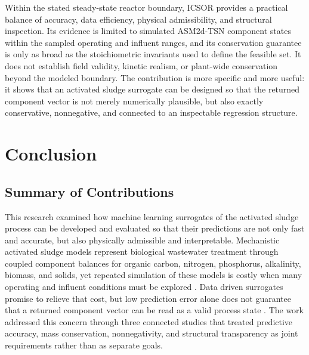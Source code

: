 \documentclass[12pt, twoside]{book}
\begin{document}
Within the stated steady-state reactor boundary, ICSOR provides a practical balance of accuracy,
data efficiency, physical admissibility, and structural inspection. Its evidence is limited to simulated
ASM2d-TSN component states within the sampled operating and influent ranges, and its conservation guarantee is
only as broad as the stoichiometric invariants used to define the feasible set. It does not establish field
validity, kinetic realism, or plant-wide conservation beyond the modeled boundary. The contribution is more
specific and more useful: it shows that an activated sludge surrogate can be designed so that the returned
component vector is not merely numerically plausible, but also exactly conservative, nonnegative, and
connected to an inspectable regression structure.


\chapter*{Conclusion}
\label{ch:concl}

\section*{Summary of Contributions}

This research examined how machine learning surrogates of the activated sludge process can be developed and
evaluated so that their predictions are not only fast and accurate, but also physically admissible and
interpretable. Mechanistic activated sludge models represent biological wastewater treatment through coupled
component balances for organic carbon, nitrogen, phosphorus, alkalinity, biomass, and solids, yet repeated
simulation of these models is costly when many operating and influent conditions must be explored
\citep{Henze2006,Guerrero2011}. Data driven surrogates promise to relieve that cost, but low prediction error
alone does not guarantee that a returned component vector can be read as a valid process state
\citep{Hansen2024,KircherVotsmeier2025}. The work addressed this concern through three connected studies that
treated predictive accuracy, mass conservation, nonnegativity, and structural transparency as joint
requirements rather than as separate goals.
\end{document}
